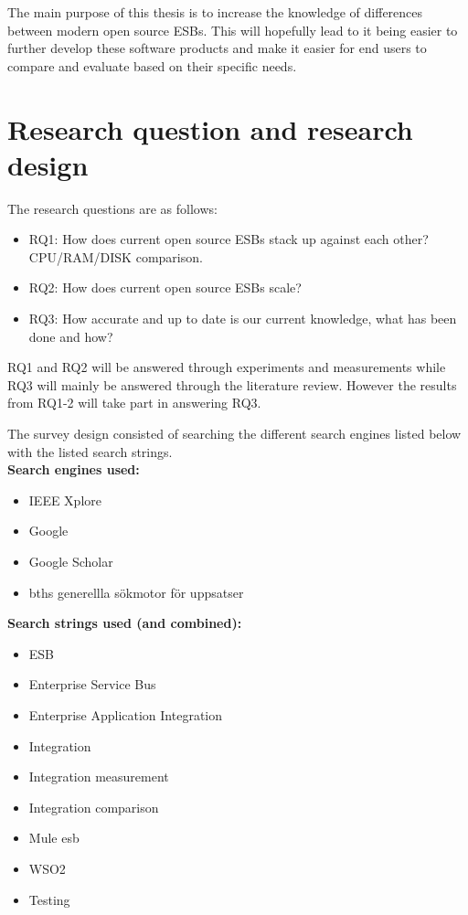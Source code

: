 \documentclass{llncs}
\begin{document}
The main purpose of this thesis is to increase the knowledge of differences between modern open source ESBs. 
This will hopefully lead to it being easier to further develop these software products and make it easier for end users to compare and evaluate based on their specific needs.


\section{Research question and research design}
The research questions are as follows:
\begin{itemize}
	\item RQ1: How does current open source ESBs stack up against each other? CPU/RAM/DISK comparison.
	\item RQ2: How does current open source ESBs scale?
	\item RQ3: How accurate and up to date is our current knowledge, what has been done and how?
\end{itemize}
RQ1 and RQ2 will be answered through experiments and measurements while RQ3 will mainly be answered through the literature review. However the results from RQ1-2 will take part in answering RQ3.

The survey design consisted of searching the different search engines listed below with the listed search strings. \\

{\bf Search engines used:}
\begin{itemize}
	\item IEEE Xplore
	\item Google
	\item Google Scholar
	\item bths generellla sökmotor för uppsatser
\end{itemize}

{\bf Search strings used (and combined):}
\begin{itemize}
	\item ESB
	\item Enterprise Service Bus
	\item Enterprise Application Integration
	\item Integration
	\item Integration measurement
	\item Integration comparison
	\item Mule esb
	\item WSO2
	\item Testing
\end{itemize}
\end{document}
